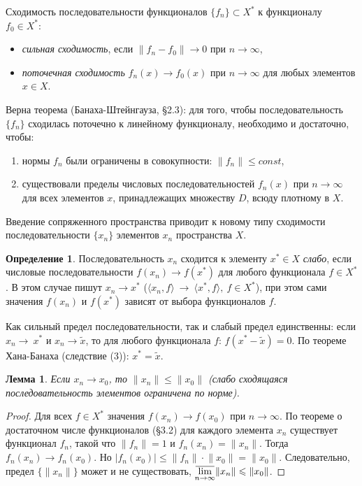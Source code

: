 \documentclass[12pt,a4paper,titlepage,oneside]{book}
\newcommand{\overbar}[1]{\mkern 1.5mu\overline{\mkern-1.5mu#1\mkern-1.5mu}\mkern 1.5mu}
\theoremstyle{definition}
\newtheorem*{definition}{Определение}
\theoremstyle{plain}
\theoremstyle{break}
\theoremstyle{remark}
\theoremstyle{remark}
\theoremstyle{remark}
\theoremstyle{remark}
\theoremstyle{plain}
\newtheorem*{lemma}{Лемма}
\theoremstyle{plain}
\begin{document}
Сходимость последовательности функционалов $\{f_n\} \subset X^*$ к функционалу $f_0\in X^*$:
\begin{itemize}
	\item \textit{сильная сходимость}, если $\lVert f_n - f_0\rVert \to 0$ при $n\to\infty$,
	
	\item \textit{поточечная сходимость} $f_n(x)\to f_0(x)$ при $n\to\infty$ для любых элементов $x\in X$.
\end{itemize}
Верна теорема (Банаха-Штейнгауза, \S 2.3): для того, чтобы последовательность $\{ f_n \}$ сходилась поточечно к линейному функционалу, необходимо и достаточно, чтобы:

\begin{enumerate}
\item нормы $f_n$ были ограничены в совокупности: $\lVert f_n\rVert \leqslant const$,
\item существовали пределы числовых последовательностей $f_n(x)$ при $n\to\infty$ для всех элементов $x$, принадлежащих множеству $D$, всюду плотному в $X$.
\end{enumerate}

Введение сопряженного пространства приводит к новому типу сходимости последовательности $\{x_n\}$ элементов $x_n$ пространства $X$.

\begin{definition}
Последовательность $x_n$ сходится к элементу $x^* \in X$ \textit{слабо}, если числовые последовательности $f(x_n) \to f(x^*)$ для любого функционала $f \in X^*$. В этом случае пишут $x_n \to x^*$ \big($ \langle x_n,f \rangle  \ \to \  \langle x^*, f \rangle ,\ f \in X^*$\big), при этом сами значения $f(x_n)$ и $f(x^*)$ зависят от выбора функционалов $f$.
\end{definition}
Как сильный предел последовательности, так и слабый предел единственны: если $x_n\to~x^*$ и $x_n \to \widetilde{x}$, то для любого функционала $f$: $f(x^*-\widetilde{x})=0$. По теореме Хана-Банаха (следствие (3)): $x^*=\widetilde{x}$.

\begin{lemma}
Если $x_n \to x_0$, то $\lVert x_n \rVert \leqslant \lVert x_0 \rVert$ (слабо сходящаяся последовательность элементов ограничена по норме).
\end{lemma}
\begin{proof}
Для всех $f \in X^*$ значения $f(x_n) \to f(x_0)$ при $n \to \infty$. По теореме о достаточном числе функционалов (\S 3.2) для каждого элемента $x_n$ существует функционал $f_n$, такой что $\lVert f_n \rVert =1$ и $f_n(x_n)=\lVert x_n \rVert$. Тогда $f_n(x_n) \to f_n(x_0)$. Но $ \vert f_n(x_0) \vert  \leqslant \lVert f_n \rVert \cdot \lVert x_0 \rVert = \lVert x_0 \rVert$. Следовательно, предел $\{ \lVert x_n \rVert \}$ может и не существовать, $\overbar{\lim \limits_{n \to \infty}}\lVert x_n \rVert \leqslant \lVert x_0 \rVert$.
\end{proof}
\end{document}
